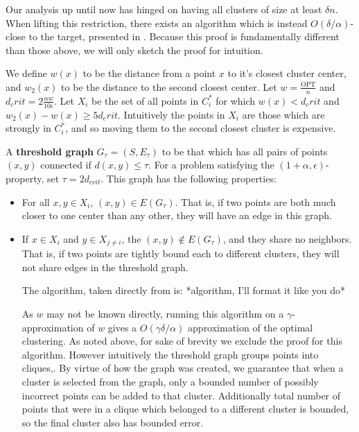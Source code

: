 \documentclass[paper=a4, fontsize=10.5pt]{scrartcl} %
\numberwithin{equation}{section} %
\numberwithin{figure}{section} %
\numberwithin{table}{section} %
\begin{document}
Our analysis up until now has hinged on having all clusters of size at least $\delta n$. When lifting this restriction, there exists an algorithm which is instead $O(\delta/\alpha)$-close to the target, presented in \cite{firstpaper}. Because this proof is fundamentally different than those above, we will only sketch the proof for intuition. 

We define $w(x)$ to be the distance from a point $x$ to it's closest cluster center, and $w_2(x)$ to be the distance to the second closest center. Let $w = \frac{\text{OPT}}{n}$ and $d_crit = 2\frac{\alpha w}{10 \epsilon}$. Let $X_i$ be the set of all points in $C_i^*$ for which $w(x) < d_crit$ and $w_2(x) - w(x) \geq 5d_crit$. Intuitively the points in $X_i$ are those which are strongly in $C_i^*$, and so moving them to the second closest cluster is expensive.

A \textbf{threshold graph} $G_\tau = (S, E_\tau)$ to be that which has all pairs of points $(x, y)$ connected if $d(x, y) \leq \tau$. For a problem satisfying the $(1 + \alpha, \epsilon)$-property, set $\tau = 2d_{crit}$. This graph has the following properties:

\begin{itemize}
\item For all $x, y \in X_i$, $(x,y) \in E(G_\tau)$. That is, if two points are both much closer to one center than any other, they will have an edge in this graph.

\item If $x \in X_i$ and $y \in X_{j \neq i}$, the $(x,y) \notin E(G_\tau)$, and they share no neighbors. That is, if two points are tightly bound each to different clusters, they will not share edges in the threshold graph. 

The algorithm, taken directly from \cite{firstpaper} is: *algorithm, I'll format it like you do*

As $w$ may not be known directly, running this algorithm on a $\gamma$-approximation of $w$ gives a $O(\gamma\delta/\alpha)$ approximation of the optimal clustering. As noted above, for sake of brevity we exclude the proof for this algorithm. However intuitively the threshold graph groups points into cliques,. By virtue of how the graph was created, we guarantee that when a cluster is selected from the graph, only a bounded number of possibly incorrect points can be added to that cluster. Additionally total number of points that were in a clique which belonged to a different cluster is bounded, so the final cluster also has bounded error. 

\end{itemize}
{}

\end{document}

